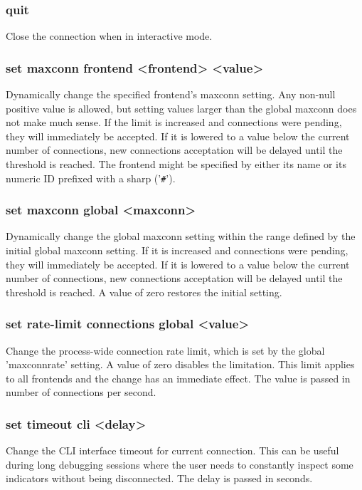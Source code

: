 \subsubsection[quit]{quit}
  Close the connection when in interactive mode.

\subsubsection[set maxconn frontend]{set maxconn frontend <frontend> <value>}
  Dynamically change the specified frontend's maxconn setting. Any non-null
  positive value is allowed, but setting values larger than the global maxconn
  does not make much sense. If the limit is increased and connections were
  pending, they will immediately be accepted. If it is lowered to a value below
  the current number of connections, new connections acceptation will be
  delayed until the threshold is reached. The frontend might be specified by
  either its name or its numeric ID prefixed with a sharp ('\verb|#|').

\subsubsection[set maxconn global]{set maxconn global <maxconn>}
  Dynamically change the global maxconn setting within the range defined by the
  initial global maxconn setting. If it is increased and connections were
  pending, they will immediately be accepted. If it is lowered to a value below
  the current number of connections, new connections acceptation will be
  delayed until the threshold is reached. A value of zero restores the initial
  setting.

\subsubsection[set rate-limit connections global]{set rate-limit connections global <value>}
  Change the process-wide connection rate limit, which is set by the global
  'maxconnrate' setting. A value of zero disables the limitation. This limit
  applies to all frontends and the change has an immediate effect. The value
  is passed in number of connections per second.

\subsubsection[set timeout cli]{set timeout cli <delay>}
  Change the CLI interface timeout for current connection. This can be useful
  during long debugging sessions where the user needs to constantly inspect
  some indicators without being disconnected. The delay is passed in seconds.

